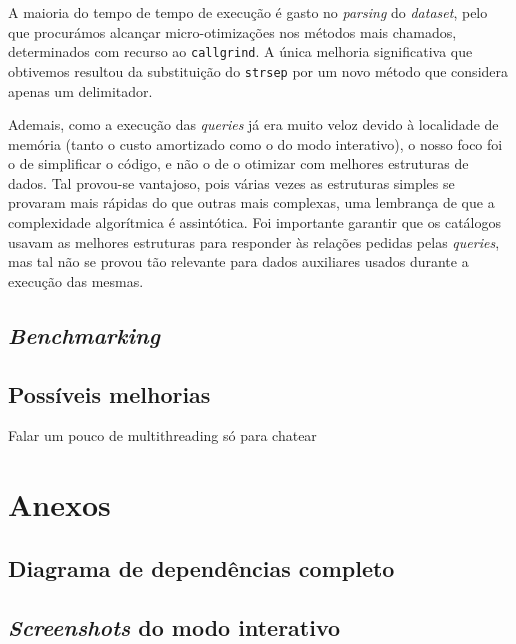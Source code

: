 \documentclass[12pt, a4paper]{article}
\begin{document}
A maioria do tempo de tempo de execução é gasto no \emph{parsing} do \emph{dataset}, pelo que
procurámos alcançar micro-otimizações nos métodos mais chamados, determinados com recurso ao
\texttt{callgrind}. A única melhoria significativa que obtivemos resultou da substituição do
\texttt{strsep} por um novo método que considera apenas um delimitador.

Ademais, como a execução das \emph{queries} já era muito veloz devido à localidade de memória
(tanto o custo amortizado como o do modo interativo), o nosso foco foi o de simplificar o código, e
não o de o otimizar com melhores estruturas de dados. Tal provou-se vantajoso, pois várias vezes as
estruturas simples se provaram mais rápidas do que outras mais complexas, uma lembrança de que a
complexidade algorítmica é assintótica. Foi importante garantir que os catálogos usavam as
melhores estruturas para responder às relações pedidas pelas \emph{queries}, mas tal não se provou
tão relevante para dados auxiliares usados durante a execução das mesmas.

\subsection{\emph{Benchmarking}}
\label{sec:benchmarking}


\subsection{Possíveis melhorias}
\label{sec:possible-performance-improvements}

{\color{red} Falar um pouco de multithreading só para chatear}

\pagebreak
\section{Anexos}
\label{sec:annexes}

\subsection{Diagrama de dependências completo}
\label{sec:complete-diagram}


\subsection{\emph{Screenshots} do modo interativo}
\label{sec:interactive-screenshots}
\end{document}
